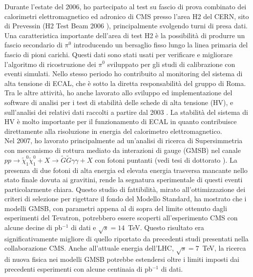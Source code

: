 \documentclass[10pt, a4paper]{article}
\begin{document}
Durante l'estate del 2006, ho partecipato al test su fascio di prova combinato dei calorimetri elettromagnetico 
ed adronico di CMS presso l'area H2 del CERN, sito di Prevessin (H2 Test Beam 2006 \cite{Abdullin:2009zz}), 
principalmente svolgendo turni di presa dati.
Una caratteristica importante dell'area di test H2 \`e la possibilit\`a di produrre un fascio secondario di $\pi^0$ 
introducendo un bersaglio fisso lungo la linea primaria del fascio di pioni carichi. Questi dati \cite{Adzic:2008zza} 
sono stati usati per verificare e migliorare l'algoritmo di ricostruzione dei $\pi^0$ sviluppato per gli studi di calibrazione 
con eventi simulati. Nello stesso periodo ho contribuito al monitoring del sistema di alta 
tensione di ECAL, che \`e sotto la diretta responsabilit\`a del gruppo di Roma. \\

Tra le altre attivit\`a, ho anche lavorato allo sviluppo ed implementazione del software di analisi per i test di stabilit\`a delle schede 
di alta tensione (HV), e sull'analisi dei relativi dati raccolti a partire dal 2003 \cite{Bartoloni:2007hx}. 
La stabilit\`a del sistema di HV \`e molto importante per il funzionamento di ECAL in quanto contribuisce 
direttamente alla risoluzione in energia del calorimetro elettromagnetico. \\

Nel 2007, ho lavorato principalmente ad un'analisi di ricerca di Supersimmetria con meccanismo di rottura mediato da 
interazioni di gauge (GMSB) nel canale 
$pp \rightarrow \tilde{\chi}_1^0 \tilde{\chi}_1^0 + X \rightarrow \tilde{G} \tilde{G} \gamma \gamma + X$  con fotoni puntanti  
(vedi tesi di dottorato \cite{Santanastasio:DOTTORATO}). 
La presenza di due fotoni di alta energia ed elevata energia trasversa mancante nello stato finale dovuta ai gravitini, 
rende la segnatura sperimentale di questi eventi particolarmente chiara. Questo studio di fattibilit\`a, mirato all'ottimizzazione 
dei criteri di selezione per rigettare il fondo del Modello Standard, ha mostrato che i modelli GMSB, con parametri appena al 
di sopra del limite ottenuto dagli esperimenti del Tevatron, potrebbero essere scoperti all'esperimento CMS 
con alcune decine di pb$^{-1}$ di dati e $\sqrt{s}=14$~TeV. Questo risultato era significativamente migliore di quello riportato da precedenti 
studi presentati nella collaborazione CMS. Anche all'attuale energia dell'LHC, $\sqrt{s}=7$~TeV, la ricerca di nuova fisica 
nei modelli GMSB potrebbe estendersi oltre i limiti imposti dai precedenti esperimenti con alcune centinaia di pb$^{-1}$ di dati. 
\end{document}
